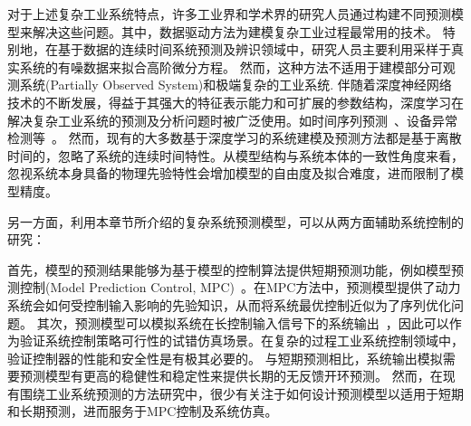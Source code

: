 对于上述复杂工业系统特点，许多工业界和学术界的研究人员通过构建不同预测模型来解决这些问题。其中，数据驱动方法为建模复杂工业过程最常用的技术\cite{larsson2002identification}。
特别地，在基于数据的连续时间系统预测及辨识领域中，研究人员主要利用采样于真实系统的有噪数据来拟合高阶微分方程。
然而，这种方法不适用于建模部分可观测系统(Partially Observed System)和极端复杂的工业系统.
伴随着深度神经网络技术的不断发展，得益于其强大的特征表示能力和可扩展的参数结构，深度学习在解决复杂工业系统的预测及分析问题时被广泛使用。如时间序列预测~\cite{Member2019,Essien2020,9161367,9522017,neu2021systematic}、设备异常检测等~\cite{9326384}。
然而，现有的大多数基于深度学习的系统建模及预测方法都是基于离散时间的，忽略了系统的连续时间特性。从模型结构与系统本体的一致性角度来看，忽视系统本身具备的物理先验特性会增加模型的自由度及拟合难度，进而限制了模型精度。

另一方面，利用本章节所介绍的复杂系统预测模型，可以从两方面辅助系统控制的研究：

首先，模型的预测结果能够为基于模型的控制算法提供短期预测功能，例如模型预测控制(Model Prediction Control, MPC)~\cite{Member2019}。在MPC方法中，预测模型提供了动力系统会如何受控制输入影响的先验知识，从而将系统最优控制近似为了序列优化问题。
其次，预测模型可以模拟系统在长控制输入信号下的系统输出~\cite{Demeester2020SystemIW}，因此可以作为验证系统控制策略可行性的试错仿真场景。在复杂的过程工业系统控制领域中，验证控制器的性能和安全性是有极其必要的。
与短期预测相比，系统输出模拟需要预测模型有更高的稳健性和稳定性来提供长期的无反馈开环预测。
然而，在现有围绕工业系统预测的方法研究中，很少有关注于如何设计预测模型以适用于短期和长期预测，进而服务于MPC控制及系统仿真。

